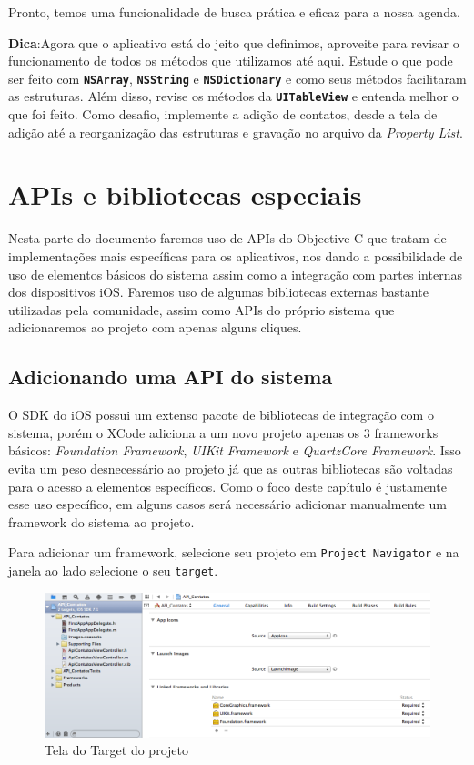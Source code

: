 \documentclass[a4paper,12pt,brazil,oneside]{book}
\begin{document}
Pronto, temos uma funcionalidade de busca prática e eficaz para a nossa agenda.

\begin{framed}

\textbf{Dica}:Agora que o aplicativo está do jeito que definimos, aproveite para revisar o funcionamento de todos os métodos que utilizamos até aqui. Estude o que pode ser feito com \texttt{\textbf{NSArray}}, \texttt{\textbf{NSString}} e \texttt{\textbf{NSDictionary}} e como seus métodos facilitaram as estruturas. Além disso, revise os métodos da \texttt{\textbf{UITableView}} e entenda melhor o que foi feito. Como desafio, implemente a adição de contatos, desde a tela de adição até a reorganização das estruturas e gravação no arquivo da \emph{Property List}.
\end{framed}

\chapter{APIs e bibliotecas especiais}

Nesta parte do documento faremos uso de APIs do Objective-C que tratam de implementações mais específicas para os aplicativos, nos dando a possibilidade de uso de elementos básicos do sistema assim como a integração com partes internas dos dispositivos iOS. Faremos uso de algumas bibliotecas externas bastante utilizadas pela comunidade, assim como APIs do próprio sistema que adicionaremos ao projeto com apenas alguns cliques.

\section{Adicionando uma API do sistema}

O SDK do iOS possui um extenso pacote de bibliotecas de integração com o sistema, porém o XCode adiciona a um novo projeto apenas os 3 frameworks básicos: \emph{Foundation Framework}, \emph{UIKit Framework} e \emph{QuartzCore Framework}. Isso evita um peso desnecessário ao projeto já que as outras bibliotecas são voltadas para o acesso a elementos específicos. Como o foco deste capítulo é justamente esse uso específico, em alguns casos será necessário adicionar manualmente um framework do sistema ao projeto.

Para adicionar um framework, selecione seu projeto em \texttt{Project Navigator} e na janela ao lado selecione o seu \texttt{target}.

\begin{figure}[H]
  \centering
  \includegraphics[width=.75\textwidth]{figuras/framework3.png}
  \caption{Tela do Target do projeto}
  \label{fig:a}
\end{figure}
\end{document}
